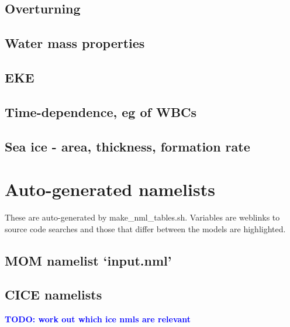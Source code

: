 \documentclass[11pt]{article}
\newcommand{\note}[1]{#1} %
\newcommand{\TODO}[1]{\note{\textcolor{blue}{\textsf{\textbf{TODO: #1}}}}}
\begin{document}
\subsection{Overturning}

\subsection{Water mass properties}

\subsection{EKE}

\subsection{Time-dependence, eg of WBCs}

\subsection{Sea ice - area, thickness, formation rate}

\appendix
\section{Auto-generated namelists}

\newcommand{\differ}[1]{\colorbox{hilite}{#1}} %
\newcommand{\link}[2]{#1} %
\setlength{\fboxsep}{0pt}

These are auto-generated by make\_nml\_tables.sh.
Variables are \textcolor{link}{weblinks} to source code searches and those that differ between the models are \differ{\textcolor{link}{highlighted}}.

\subsection{MOM namelist `input.nml'}
\renewcommand{\link}[2]{\href{https://github.com/mom-ocean/MOM5/search?q=#2}{#1}} %
{\tiny }

\subsection{CICE namelists}
\renewcommand{\link}[2]{\href{https://github.com/OceansAus/cice5/search?q=#2}{#1}} %
\TODO{work out which ice nmls are relevant}
\end{document}
